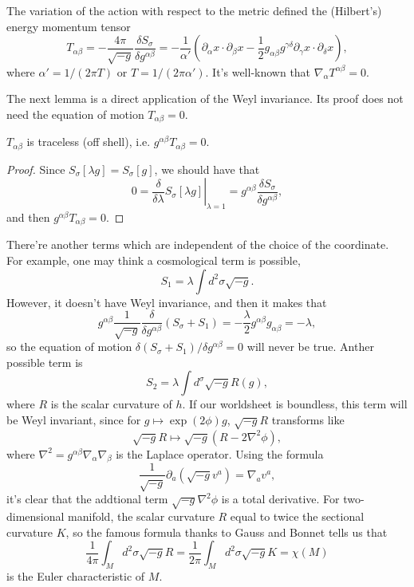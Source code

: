 The variation of the action with respect to the metric
defined the (Hilbert's) energy momentum tensor
\[
	T_{\alpha\beta}=-\frac{4\pi}{\sqrt{-g}}
	\frac{\delta S_\sigma}{\delta g^{\alpha\beta}}=
	-\frac{1}{\alpha'}\left(
	\partial_\alpha x\cdot \partial_\beta x-
	\frac 12 g_{\alpha\beta}g^{\gamma\delta}
	\partial_\gamma x\cdot \partial_\delta x
	\right),
\]
where $\alpha'=1/(2\pi T)$ or $T=1/(2\pi \alpha')$. 
It's well-known that $\nabla_\alpha T^{\alpha \beta}=0$.

The next lemma is a direct application of the Weyl invariance.
Its proof does not need the equation of motion $T_{\alpha\beta}=0$.

\begin{lem}
	$T_{\alpha\beta}$ is traceless (off shell), i.e. $g^{\alpha\beta}T_{\alpha\beta}=0$.
\end{lem}

\begin{proof}
	Since $S_\sigma[\lambda g]=S_\sigma[g]$, we should have that
	\[
		0=\left.\frac{\delta}{\delta \lambda}S_\sigma[\lambda g]
		\right |_{\lambda=1}
		=g^{\alpha\beta}\frac{\delta S_\sigma}{\delta g^{\alpha\beta}},
	\]
	and then $g^{\alpha\beta}T_{\alpha\beta}=0$.
\end{proof}


There're another terms which are independent of the choice
of the coordinate. For example, one may think a cosmological
term is possible,
\[
	S_1=\lambda \int d^2\sigma \sqrt{-g}.
\]
However, it doesn't have Weyl invariance, and then it 
makes that
\[
	g^{\alpha\beta}\frac{1}{\sqrt{-g}}
	\frac{\delta}{\delta g^{\alpha\beta}} (S_\sigma+S_1)=
	-\frac{\lambda}{2}g^{\alpha\beta}g_{\alpha\beta}=-\lambda,
\]
so the equation of motion 
$\delta (S_\sigma+S_1)/\delta g^{\alpha\beta}=0$ will never 
be true. Anther possible term is 
\[
	S_2=\lambda \int d^\sigma \sqrt{-g} R(g),
\]
where $R$ is the scalar curvature of $h$. 
If our worldsheet is boundless, this term will be Weyl 
invariant, since for $g\mapsto \exp(2\phi)g$, $\sqrt{-g}R$ 
transforms like
\[
\sqrt{-g}R\longmapsto \sqrt{-g}(R-2\nabla^2 \phi),
\]
where $\nabla^2=g^{\alpha\beta}\nabla_\alpha\nabla_\beta$
is the Laplace operator. Using the formula
\[
	\frac{1}{\sqrt{-g}}\partial_a (\sqrt{-g}v^a)=\nabla_a v^a,
\]
it's clear that the addtional term $\sqrt{-g}\nabla^2 \phi$
is a total derivative. For two-dimensional manifold, the
scalar curvature $R$ equal to twice the sectional curvature 
$K$, so the famous formula thanks to Gauss and Bonnet 
tells us that
\[
	\frac{1}{4\pi}\int_M d^2\sigma \sqrt{-g} R
	=\frac{1}{2\pi}\int_M d^2\sigma \sqrt{-g} K=
	\chi (M)
\]
is the Euler characteristic of $M$.

